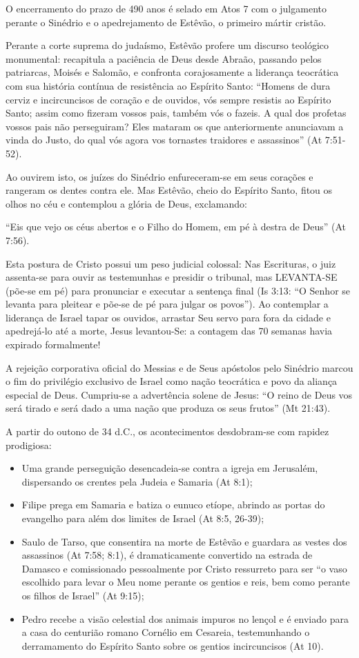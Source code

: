 O encerramento do prazo de 490 anos é selado em Atos 7 com o julgamento perante o Sinédrio e o apedrejamento de Estêvão, o primeiro mártir cristão.

Perante a corte suprema do judaísmo, Estêvão profere um discurso teológico monumental: recapitula a paciência de Deus desde Abraão, passando pelos patriarcas, Moisés e Salomão, e confronta corajosamente a liderança teocrática com sua história contínua de resistência ao Espírito Santo: ``Homens de dura cerviz e incircuncisos de coração e de ouvidos, vós sempre resistis ao Espírito Santo; assim como fizeram vossos pais, também vós o fazeis. A qual dos profetas vossos pais não perseguiram? Eles mataram os que anteriormente anunciavam a vinda do Justo, do qual vós agora vos tornastes traidores e assassinos'' (At 7:51-52).

Ao ouvirem isto, os juízes do Sinédrio enfureceram-se em seus corações e rangeram os dentes contra ele. Mas Estêvão, cheio do Espírito Santo, fitou os olhos no céu e contemplou a glória de Deus, exclamando:

``Eis que vejo os céus abertos e o Filho do Homem, em pé à destra de Deus'' (At 7:56).

Esta postura de Cristo possui um peso judicial colossal:
Nas Escrituras, o juiz assenta-se para ouvir as testemunhas e presidir o tribunal, mas LEVANTA-SE (põe-se em pé) para pronunciar e executar a sentença final (Is 3:13: ``O Senhor se levanta para pleitear e põe-se de pé para julgar os povos''). Ao contemplar a liderança de Israel tapar os ouvidos, arrastar Seu servo para fora da cidade e apedrejá-lo até a morte, Jesus levantou-Se: a contagem das 70 semanas havia expirado formalmente!

A rejeição corporativa oficial do Messias e de Seus apóstolos pelo Sinédrio marcou o fim do privilégio exclusivo de Israel como nação teocrática e povo da aliança especial de Deus. Cumpriu-se a advertência solene de Jesus: ``O reino de Deus vos será tirado e será dado a uma nação que produza os seus frutos'' (Mt 21:43).

A partir do outono de 34 d.C., os acontecimentos desdobram-se com rapidez prodigiosa:
\begin{itemize}
  \item Uma grande perseguição desencadeia-se contra a igreja em Jerusalém, dispersando os crentes pela Judeia e Samaria (At 8:1);
  \item Filipe prega em Samaria e batiza o eunuco etíope, abrindo as portas do evangelho para além dos limites de Israel (At 8:5, 26-39);
  \item Saulo de Tarso, que consentira na morte de Estêvão e guardara as vestes dos assassinos (At 7:58; 8:1), é dramaticamente convertido na estrada de Damasco e comissionado pessoalmente por Cristo ressurreto para ser ``o vaso escolhido para levar o Meu nome perante os gentios e reis, bem como perante os filhos de Israel'' (At 9:15);
  \item Pedro recebe a visão celestial dos animais impuros no lençol e é enviado para a casa do centurião romano Cornélio em Cesareia, testemunhando o derramamento do Espírito Santo sobre os gentios incircuncisos (At 10).
\end{itemize}


